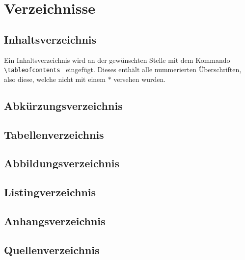 \section{Verzeichnisse}
\subsection{Inhaltsverzeichnis}
Ein Inhaltsverzeichnis wird an der gewünschten Stelle mit dem Kommando 
\lstinline$ \tableofcontents $ eingefügt. Dieses enthält alle nummerierten 
Überschriften, also diese, welche nicht mit einem $*$ versehen wurden.
\subsection{Abkürzungsverzeichnis}
\subsection{Tabellenverzeichnis}
\subsection{Abbildungsverzeichnis}
\subsection{Listingverzeichnis}
\subsection{Anhangsverzeichnis}
\subsection{Quellenverzeichnis}



\listoffigures %
\listoftables %
\lstlistoflistings %